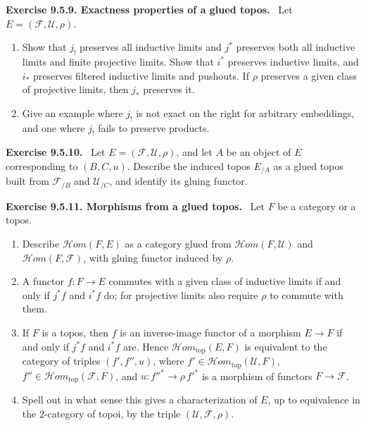 \documentclass[11pt]{article}
\newcommand{\Uu}{\mathcal{U}}
\newcommand{\Ff}{\mathcal{F}}
\newcommand{\Hhom}{\mathcal{H}om}
\newcommand{\Hhomtop}{\mathcal{H}om_{\mathrm{top}}}
\newenvironment{remarktext}[1]{\par\medskip\noindent\textbf{#1.}\ }{\par\medskip}
\begin{document}
\begin{remarktext}{Exercise 9.5.9. Exactness properties of a glued topos}
Let \(E=(\Ff,\Uu,\rho)\).
\begin{enumerate}[label=\alph*)]
\item Show that \(j_!\) preserves all inductive limits and \(j^*\) preserves both all inductive limits and finite projective limits. Show that \(i^*\) preserves inductive limits, and \(i_*\) preserves filtered inductive limits and pushouts. If \(\rho\) preserves a given class of projective limits, then \(j_*\) preserves it.
\item Give an example where \(j_!\) is not exact on the right for arbitrary embeddings, and one where \(j_!\) fails to preserve products.
\end{enumerate}
\end{remarktext}

\begin{remarktext}{Exercise 9.5.10}
Let \(E=(\Ff,\Uu,\rho)\), and let \(A\) be an object of \(E\) corresponding to \((B,C,u)\). Describe the induced topos \(E_{/A}\) as a glued topos built from \(\Ff_{/B}\) and \(\Uu_{/C}\), and identify its gluing functor.
\end{remarktext}

\begin{remarktext}{Exercise 9.5.11. Morphisms from a glued topos}
Let \(F\) be a category or a topos.
\begin{enumerate}[label=\alph*)]
\item Describe \(\Hhom(F,E)\) as a category glued from \(\Hhom(F,\Uu)\) and \(\Hhom(F,\Ff)\), with gluing functor induced by \(\rho\).
\item A functor \(f:F\to E\) commutes with a given class of inductive limits if and only if \(j^*f\) and \(i^*f\) do; for projective limits also require \(\rho\) to commute with them.
\item If \(F\) is a topos, then \(f\) is an inverse-image functor of a morphism \(E\to F\) if and only if \(j^*f\) and \(i^*f\) are. Hence \(\Hhomtop(E,F)\) is equivalent to the category of triples \((f',f'',u)\), where \(f'\in\Hhomtop(\Uu,F)\), \(f''\in\Hhomtop(\Ff,F)\), and \(u:{f''}^*\to\rho\,{f'}^*\) is a morphism of functors \(F\to\Ff\).
\item Spell out in what sense this gives a characterization of \(E\), up to equivalence in the \(2\)-category of topoi, by the triple \((\Uu,\Ff,\rho)\).
\end{enumerate}
\end{remarktext}
\end{document}
